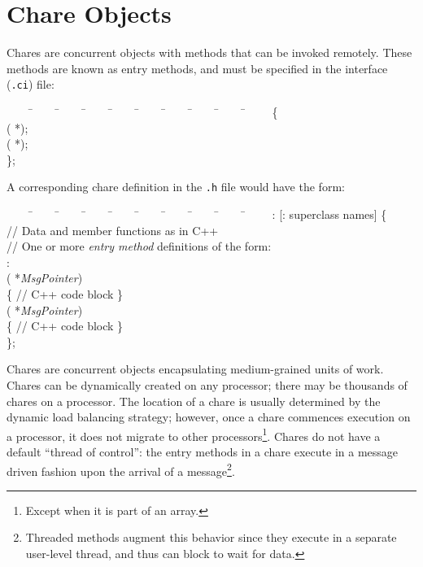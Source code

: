 \section{Chare Objects}

Chares are concurrent objects with methods that can be invoked
remotely.  These methods are known as entry methods, and 
must be specified in the interface ({\tt .ci}) file:

\begin{tabbing}
~~~~ \=~~~~ \=~~~~ \=~~~~ \=~~~~ \=~~~~ \=~~~~ \=~~~~ \=~~~~ \=~~~~ \kill
\>   \{ \\
\> \>  ( *); \\
\> \>  ( *); \\
\> \};
\end{tabbing}

A corresponding chare definition in the {\tt .h} file would 
have the form:

\begin{tabbing}
~~~~ \=~~~~ \=~~~~ \=~~~~ \=~~~~ \=~~~~ \=~~~~ \=~~~~ \=~~~~ \=~~~~ \kill
\>   :  [: superclass names] \{ \\
\> \>   // Data and member functions as in C++ \\
\> \>   // One or more {\it entry method} 
definitions of the form: \\
\> : \\
\> \> ( *{\it MsgPointer}) \\
\> \> \> \{ // C++ code block  \} \\
\> \>  ( *{\it MsgPointer}) \\
\> \> \> \{ // C++ code block  \} \\
\> \};
\end{tabbing}

Chares are concurrent objects encapsulating medium-grained units of
work.  Chares can be dynamically created on any processor; there may
be thousands of chares on a processor. The location of a chare is
usually determined by the dynamic load balancing strategy; however,
once a chare commences execution on a processor, it does not migrate
to other processors\footnote{Except when it is part of an array.}.  
Chares do not have a default ``thread of
control'': the entry methods  in a
chare execute in a message driven fashion upon the arrival of a 
message\footnote{Threaded methods augment this behavior since they execute in
a separate user-level thread, and thus can block to wait for data.}.


